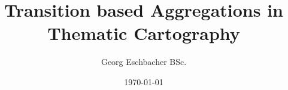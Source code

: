 \newcommand{\iauthor}{Georg Eschbacher BSc.}
\newcommand{\isupervisor}{Assist.-Prof. Dipl.-Ing. Dr.techn. Marc Streit}
\newcommand{\imatrikel}{1410695001}
\newcommand{\ititle}{Transition based Aggregations in Thematic Cartography}
\newcommand{\ipapertype}{Masterthesis}


\newcommand{\tattainment}{zur Erlangung des akademischen Grades}
\newcommand{\tdegree}{Master of Science}
\newcommand{\tauthor}{Verfasser}
\newcommand{\tsubmitted}{Vorgelegt am FH Masterstudiengang MultiMediaTechnology, Fachhochschule Salzburg}
\newcommand{\texamined}{Begutachtet durch}
\newcommand{\tsupervisor}{Betreuer}

\title{\ititle}
\author{\iauthor}


\date{\today}